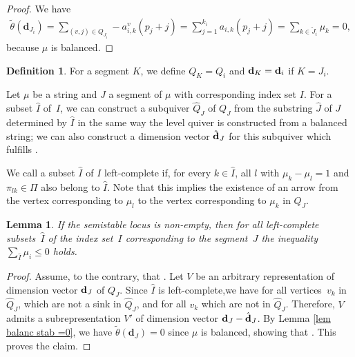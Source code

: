 \documentclass[10pt,a4paper]{amsart}
\numberwithin{equation}{section}
\newtheorem{Lemma}[Theorem]{Lemma}
\theoremstyle{definition}
\newtheorem{Definition}[Theorem]{Definition}
\begin{document}
\begin{proof}We have
\begin{align*}
\tilde{\theta} (\mathbf{d}_{J_i})= \sum_{(v,j) \in Q_{J_i}} - a_{i,k}^v (p_j+j) = \sum_{j=1}^{k_i} a_{i,k} (p_j+j) = \sum_{k \in \tilde{J}_i} \mu_k =0 ,
\end{align*}
because $\mu$ is balanced.
\end{proof}

\begin{Definition}For a segment $K$, we define $Q_K=Q_i$ and ${\bf d}_K={\bf d}_i$ if $K=J_i$.

Let $\mu$ be a string and $J$ a segment of $\mu$ with corresponding index set $I$. For a subset $\hat{I}$ of~$I$, we can construct a subquiver $\hat{Q}_J$ of $Q_J$ from the substring $\hat{J}$ of $J$ determined by $\hat{I}$ in the same way the level quiver is constructed from a balanced string; we can also construct a dimension vector $\hat{{\bf d}}_J$ for this subquiver which fulfills .

We call a subset $\hat{I}$ of $I$ left-complete if, for every $k \in \hat{I}$, all $l$ with $\mu_k -\mu_l =1$ and $\pi_{lk} \in \Pi$ also belong to $\hat{I}$. Note that this implies the existence of an arrow from the vertex corresponding to $\mu_l$ to the vertex corresponding to $\mu_k$ in $Q_J$.
\end{Definition}

\begin{Lemma} \label{lem inequ for left-complete}
If the semistable locus  is non-empty, then for all left-complete subsets~$\hat{I}$ of the index set~$I$ corresponding to the segment~$J$ the inequality
$\sum_{\hat{I}} \mu_i \leq 0$
holds.
\end{Lemma}
\begin{proof}Assume, to the contrary, that . Let $V$ be an arbitrary representation of dimension vector ${\bf d}_J$ of $Q_J$. Since $\hat{I}$ is left-complete,we have  for all vertices~$v_k$ in $\hat{Q}_J$, which are not a sink in $\hat{Q}_J$, and  for all $v_k$ which are not in $\hat{Q}_J$. Therefore, $V$ admits a subrepresentation $V'$ of dimension vector ${\bf d}_J -\hat{\bf d}_J$. By Lemma \ref{lem balanc stab =0}, we have $\tilde{\theta} (\mathbf{d}_J) = 0$ since $\mu$ is balanced, showing that . This proves the claim.
\end{proof}
\end{document}
